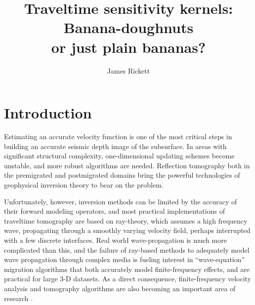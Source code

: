 \def\figdir{./Fig} 
\title{Traveltime sensitivity kernels: Banana-doughnuts \\ or just
plain bananas?}

\author{James Rickett}

\maketitle



\section{Introduction}
Estimating an accurate velocity function is one of the most critical
steps in building an accurate seismic depth image of the subsurface.
In areas with significant structural complexity, one-dimensional
updating schemes become unstable, and more robust algorithms are
needed.
Reflection tomography both in the premigrated \cite[]{bishop85} and
postmigrated domains \cite[]{stork92,kosloff96} bring the powerful
technologies of geophysical inversion theory
to bear on the problem. 

\par
Unfortunately, however, inversion methods can be limited by the
accuracy of their forward modeling operators, and most practical 
implementations of traveltime tomography are based on ray-theory,
which assumes a high frequency wave, propagating through a smoothly
varying velocity field, perhaps interrupted with a few discrete
interfaces. 
Real world wave-propagation is much more complicated than this, and 
the failure of ray-based methods to adequately model wave propagation
through complex media is fueling interest in ``wave-equation''
migration algorithms that both accurately model finite-frequency
effects, and are practical for large 3-D datasets.
As a direct consequence, finite-frequency velocity analysis and
tomography algorithms are also becoming an important area of research 
\cite[]{woodward92,biondi.segab99}.

